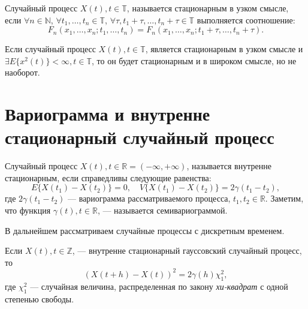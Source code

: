 \begin{Definition}
	Случайный процесс $ X(t), t \in \mathbb{T} $, называется стационарным в узком смысле, если $ \forall n \in \mathbb{N} $, $ \forall t_1, \dots, t_n \in \mathbb{T} $, $ \forall \tau, t_1 + \tau, \dots, t_n + \tau \in \mathbb{T} $ выполняется соотношение:
	\begin{equation*}
		F_n(x_1, \dots, x_n; t_1, \dots, t_n) = F_n(x_1, \dots, x_n; t_1 + \tau , \dots, t_n + \tau).
	\end{equation*}
\end{Definition}

\begin{Remark}
	Если случайный процесс $ X(t), t \in \mathbb{T} $, является стационарным в узком смысле и $ \exists E \{ x^2(t) \} < \infty, t \in \mathbb{T} $, то он будет стационарным и в широком смысле, но не наоборот.
\end{Remark}

\section{Вариограмма и внутренне стационарный случайный процесс}
\label{sec:variogramAndInnerStationarity}


\begin{Definition}
	Случайный процесс $ X(t), t \in \mathbb{R} = (-\infty, +\infty) $, называется внутренне стационарным, если справедливы следующие равенства:
	\begin{equation*}
		E \{ X(t_1) - X(t_2) \} = 0, \quad V \{ X(t_1) - X(t_2) \} = 2 \gamma(t_1 - t_2),
	\end{equation*}
	где $ 2 \gamma(t_1 - t_2) $ --- вариограмма рассматриваемого процесса, $ t_1, t_2 \in \mathbb{R} $. Заметим, что функция $ \gamma(t), t \in \mathbb{R} $, --- называется семивариограммой.
\end{Definition}


В дальнейшем рассматриваем случайные процессы с дискретным временем.

\begin{Remark}
	Если $ X(t), t \in \mathbb{Z} $, --- внутренне стационарный гауссовский случайный процесс, то
	\begin{equation*}
		( X(t + h) - X(t) )^2 = 2 \gamma(h)\chi_1^2,
	\end{equation*}
	где $\chi_1^2$ --- случайная величина, распределенная по закону \textit{хи-квадрат} с одной степенью свободы.
\end{Remark}

